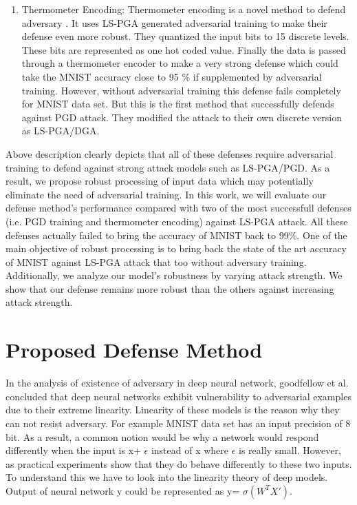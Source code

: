 \documentclass[conference]{IEEEtran}
\begin{document}
\begin{enumerate}
\item Thermometer Encoding: Thermometer encoding is a novel method to defend adversary \cite{anonymous2018thermometer}. It uses LS-PGA generated adversarial training to make their defense even more robust. They quantized the input bits to 15 discrete levels. These bits are represented as one hot coded value. Finally the data is passed through a thermometer encoder to make a very strong defense which could take the MNIST accuracy close to 95 \% if supplemented by adversarial training. However, without adversarial training this defense fails completely for MNIST data set. But this is the first method that successfully defends against PGD attack. They modified the attack to their own discrete version as LS-PGA/DGA.
\end{enumerate}

Above description clearly depicts that all of these defenses require adversarial training to defend against strong attack models such as LS-PGA/PGD. As a result, we propose robust processing of input data which may potentially eliminate the need of adversarial training. In this work, we will evaluate our defense method's performance compared with two of the most successfull defenses (i.e. PGD training and thermometer encoding) against LS-PGA attack. All these defenses actually failed to bring the accuracy of MNIST back to 99\%. One of the main objective of robust processing is to bring back the state of the art accuracy of MNIST against LS-PGA attack that too without adversary training. Additionally, we analyze our model's robustness by varying attack strength. We show that our defense remains more robust than the others against increasing attack strength.

\section{Proposed Defense Method}
In the analysis of existence of adversary in deep neural network, goodfellow et al. \cite{goodfellow2014explaining} concluded that deep neural networks exhibit vulnerability to adversarial examples due to their extreme linearity. Linearity of these models is the reason why they can not resist adversary. For example MNIST data set has an input precision of 8 bit. As a result, a common notion would be why a network would respond differently when the input is x+ $\epsilon$ instead of x where $\epsilon$ is really small. However, as practical experiments show that they do behave differently to these two inputs. To understand this we have to look into the linearity theory of deep models. Output of neural network y could be represented as y= $\sigma(W^TX')$.
\end{document}
